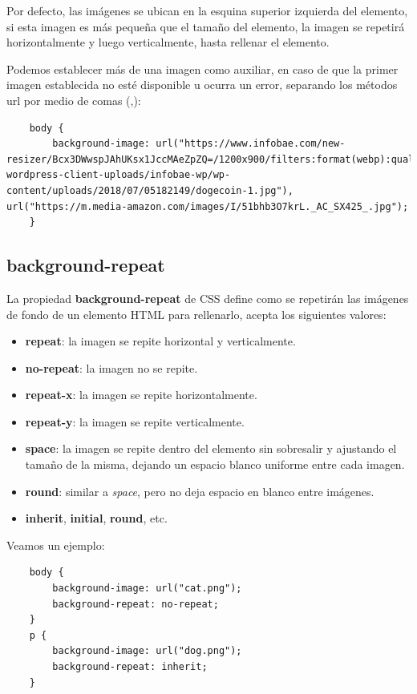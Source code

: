 Por defecto, las imágenes se ubican en la esquina superior izquierda del elemento, si esta imagen es más pequeña que el tamaño del elemento, la imagen se repetirá horizontalmente y luego verticalmente, hasta rellenar el elemento.

Podemos establecer más de una imagen como auxiliar, en caso de que la primer imagen establecida no esté disponible u ocurra un error, separando los métodos url por medio de comas (,):
\begin{lstlisting}
    body {
        background-image: url("https://www.infobae.com/new-resizer/Bcx3DWwspJAhUKsx1JccMAeZpZQ=/1200x900/filters:format(webp):quality(85)//s3.amazonaws.com/arc-wordpress-client-uploads/infobae-wp/wp-content/uploads/2018/07/05182149/dogecoin-1.jpg"), url("https://m.media-amazon.com/images/I/51bhb3O7krL._AC_SX425_.jpg");
    }
\end{lstlisting}


\subsection{background-repeat}

La propiedad \textbf{background-repeat} de CSS define como se repetirán las imágenes de fondo de un elemento HTML para rellenarlo, acepta los siguientes valores:
\begin{itemize}
    \item \textbf{repeat}: la imagen se repite horizontal y verticalmente.
    \item \textbf{no-repeat}: la imagen no se repite.
    \item \textbf{repeat-x}: la imagen se repite horizontalmente.
    \item \textbf{repeat-y}: la imagen se repite verticalmente.
    \item \textbf{space}: la imagen se repite dentro del elemento sin sobresalir y ajustando el tamaño de la misma, dejando un espacio blanco uniforme entre cada imagen.
    \item \textbf{round}: similar a \textit{space}, pero no deja espacio en blanco entre imágenes.
    \item \textbf{inherit}, \textbf{initial}, \textbf{round}, etc.
\end{itemize}

Veamos un ejemplo:
\begin{lstlisting}
    body {
        background-image: url("cat.png");
        background-repeat: no-repeat;
    }
    p {
        background-image: url("dog.png");
        background-repeat: inherit;
    }
\end{lstlisting}


